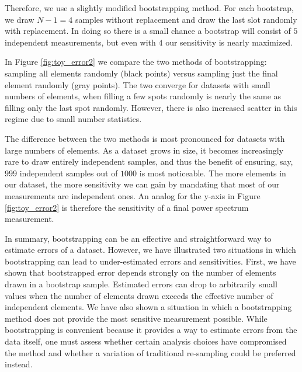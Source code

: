 \documentclass[preprint2,numberedappendix,tighten]{aastex6}  %
\begin{document}
Therefore, we use a slightly modified bootstrapping method. For each bootstrap, we draw $N-1=4$ samples without 
replacement and draw the last slot randomly with replacement. In doing so there is a small chance a bootstrap will consist of 
$5$ independent measurements, but even with $4$ our sensitivity is nearly maximized. 

In Figure \ref{fig:toy_error2} we compare the two methods of bootstrapping: sampling all elements randomly (black points) 
versus sampling just the final element randomly (gray points). The two converge for datasets with small numbers of elements, 
when filling a few spots randomly is nearly the same as filling only the last spot randomly. However, there is also increased 
scatter in this regime due to small number statistics. 

The difference between the two methods is most pronounced for datasets with large numbers of elements. As a dataset grows 
in size, it becomes increasingly rare to draw entirely independent samples, and thus the benefit of ensuring, say, $999$ 
independent samples out of $1000$ is most noticeable. The more elements in our dataset, the more sensitivity we can gain by 
mandating that most of our measurements are independent ones. An analog for the y-axis in Figure \ref{fig:toy_error2} is 
therefore the sensitivity of a final power spectrum measurement.

In summary, bootstrapping can be an effective and straightforward way to estimate errors of a dataset. However, we have 
illustrated two situations in which bootstrapping can lead to under-estimated errors and sensitivities. First, we have shown that 
bootstrapped error depends strongly on the number of elements drawn in a bootstrap sample. Estimated errors can drop to 
arbitrarily small values when the number of elements drawn exceeds the effective number of independent elements. We have 
also shown a situation in which a bootstrapping method does not provide the most sensitive measurement possible. While 
bootstrapping is convenient because it provides a way to estimate errors from the data itself, one must assess whether certain 
analysis choices have compromised the method and whether a variation of traditional re-sampling could be preferred instead.
\end{document}
